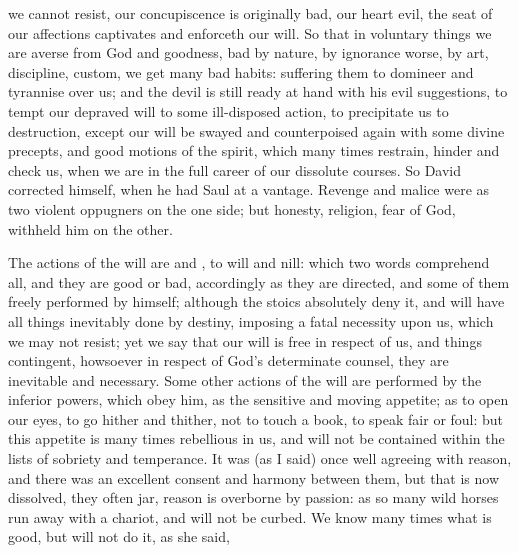 
we cannot resist, our concupiscence is originally bad, our heart evil, the seat
of our affections captivates and enforceth our will. So that in voluntary
things we are averse from God and goodness, bad by nature, by
ignorance worse, by art, discipline, custom, we get many
bad habits: suffering them to domineer and tyrannise over us; and the devil is
still ready at hand with his evil suggestions, to tempt our depraved will to
some ill-disposed action, to precipitate us to destruction, except our will be
swayed and counterpoised again with some divine precepts, and good motions of
the spirit, which many times restrain, hinder and check us, when we are in the
full career of our dissolute courses. So David corrected himself, when he had
Saul at a vantage. Revenge and malice were as two violent oppugners on the one
side; but honesty, religion, fear of God, withheld him on the other.

The actions of the will are  and , to will and nill: which
two words comprehend all, and they are good or bad, accordingly as they are
directed, and some of them freely performed by himself; although the stoics
absolutely deny it, and will have all things inevitably done by destiny,
imposing a fatal necessity upon us, which we may not resist; yet we say that
our will is free in respect of us, and things contingent, howsoever in respect
of God's determinate counsel, they are inevitable and necessary. Some other
actions of the will are performed by the inferior powers, which obey him, as
the sensitive and moving appetite; as to open our eyes, to go hither and
thither, not to touch a book, to speak fair or foul: but this appetite is many
times rebellious in us, and will not be contained within the lists of sobriety
and temperance. It was (as I said) once well agreeing with reason, and there
was an excellent consent and harmony between them, but that is now dissolved,
they often jar, reason is overborne by passion:  as so many wild horses run away with a chariot, and will
not be curbed. We know many times what is good, but will not do it, as she
said,

